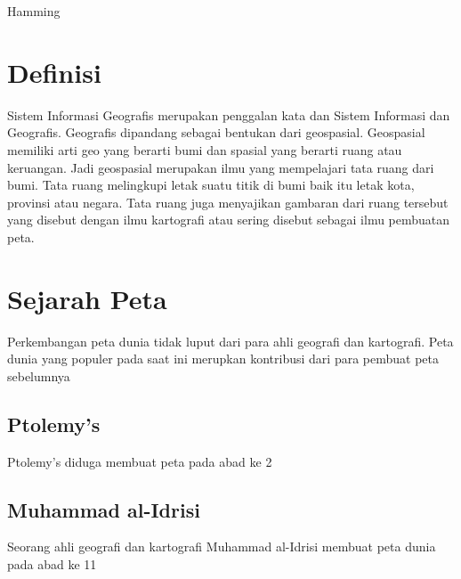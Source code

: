 {Hamming}

\section{Definisi}
Sistem Informasi Geografis merupakan penggalan kata dan Sistem Informasi dan Geografis. Geografis dipandang sebagai bentukan dari geospasial.
Geospasial memiliki arti geo yang berarti bumi dan spasial yang berarti ruang atau keruangan. Jadi geospasial merupakan ilmu yang mempelajari 
tata ruang dari bumi. Tata ruang melingkupi letak suatu titik di bumi baik itu letak kota, provinsi atau negara. Tata ruang juga menyajikan gambaran dari ruang tersebut yang disebut dengan ilmu kartografi atau sering disebut sebagai ilmu pembuatan peta.

\section{Sejarah Peta}
Perkembangan peta dunia tidak luput dari para ahli geografi dan kartografi. Peta dunia yang populer pada saat ini merupkan kontribusi dari para 
pembuat peta sebelumnya

\subsection{Ptolemy's}
Ptolemy's diduga membuat peta pada abad ke 2


\subsection{Muhammad al-Idrisi}
Seorang ahli geografi dan kartografi Muhammad al-Idrisi membuat peta dunia pada abad ke 11

